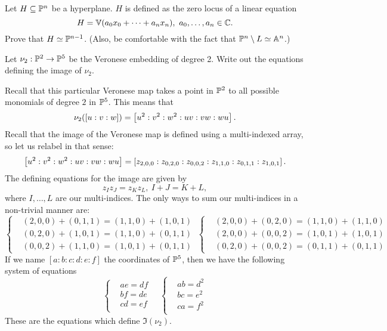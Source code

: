 \documentclass[12pt]{memoir}
\begin{document}
\begin{Ej}
 Let $H\subseteq\mathbb{P}^n$ be a hyperplane. $H$ is defined as the zero locus of a linear equation 
 $$H=\bV(a_0x_0+\dots+a_nx_n),\ a_0,\dots,a_n\in\bC.$$
 Prove that $H\simeq\mathbb{P}^{n-1}$. (Also, be comfortable with the fact that $\mathbb{P}^n\setminus L\simeq\mathbb{A}^n$.) 
\end{Ej}

\begin{ptcbr}
    
  \end{ptcbr}

\begin{Ej}
  Let $\nu_2:\mathbb{P}^2\to\mathbb{P}^5$ be the Veronese embedding of degree 2. Write out the equations defining the image of $\nu_2$.
\end{Ej}

\begin{ptcbr}
  Recall that this particular Veronese map takes a point in $\mathbb{P}^2$ to all possible monomials of degree $2$ in $\mathbb{P}^5$. This means that 
  $$\nu_2(\left\lbrack u:v:w\right\rbrack)=\left\lbrack u^2:v^2:w^2:uv:vw:wu\right\rbrack.$$
  Recall that the image of the Veronese map is defined using a multi-indexed array, so let us relabel in that sense:
  $$\left\lbrack u^2:v^2:w^2:uv:vw:wu\right\rbrack=\left\lbrack z_{2,0,0}:z_{0,2,0}:z_{0,0,2}:z_{1,1,0}:z_{0,1,1}:z_{1,0,1}\right\rbrack.$$
  The defining equations for the image are given by 
  $$z_Iz_J=z_Kz_L,\ I+J=K+L,$$
  where $I,\dots,L$ are our multi-indices. The only ways to sum our multi-indices in a non-trivial manner are:
  $$
  \left\lbrace
  \begin{aligned}
    &(2,0,0)+(0,1,1)=(1,1,0)+(1,0,1)\\
    &(0,2,0)+(1,0,1)=(1,1,0)+(0,1,1)\\
    &(0,0,2)+(1,1,0)=(1,0,1)+(0,1,1)
  \end{aligned}
  \right.\ 
  \left\lbrace
  \begin{aligned}
    &(2,0,0)+(0,2,0)=(1,1,0)+(1,1,0)\\
    &(2,0,0)+(0,0,2)=(1,0,1)+(1,0,1)\\
    &(0,2,0)+(0,0,2)=(0,1,1)+(0,1,1)
  \end{aligned}
  \right.
  $$
  If we name $[a:b:c:d:e:f]$ the coordinates of $\mathbb{P}^5$, then we have the following system of equations 
  $$
  \left\lbrace
  \begin{aligned}
    &ae=df\\
    &bf=de\\
    &cd=ef\\
  \end{aligned}
  \right.\quad 
  \left\lbrace
  \begin{aligned}
    &ab=d^2\\
    &bc=e^2\\
    &ca=f^2\\
  \end{aligned}
  \right.
  $$
  These are the equations which define $\Im(\nu_2)$.
\end{ptcbr}
\end{document}
